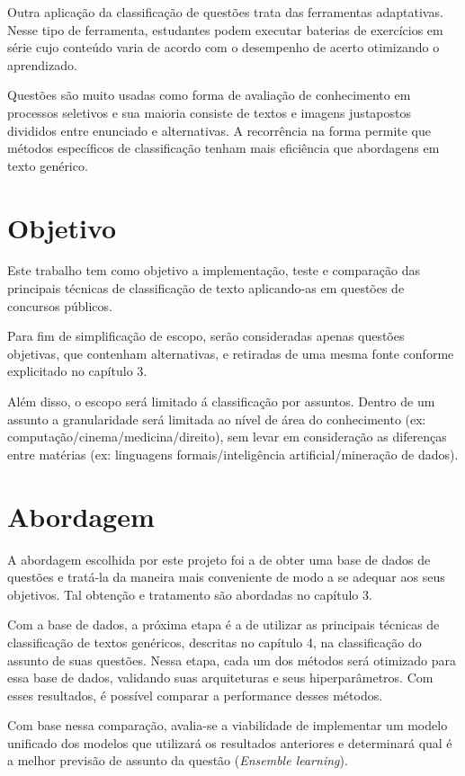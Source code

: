 Outra aplicação da classificação de questões trata das ferramentas adaptativas. Nesse tipo de ferramenta, estudantes podem executar baterias de exercícios em série cujo conteúdo varia de acordo com o desempenho de acerto otimizando o aprendizado.

Questões são muito usadas como forma de avaliação de conhecimento em processos seletivos e sua maioria consiste de textos e imagens justapostos divididos entre enunciado e alternativas. A recorrência na forma permite que métodos específicos de classificação tenham mais eficiência que abordagens em texto genérico.

\section{Objetivo}
Este trabalho tem como objetivo a implementação, teste e comparação das principais técnicas de classificação de texto aplicando-as em questões de concursos públicos.

Para fim de simplificação de escopo, serão consideradas apenas questões objetivas, que contenham alternativas, e retiradas de uma mesma fonte conforme explicitado no capítulo 3.

Além disso, o escopo será limitado á classificação por assuntos. Dentro de um assunto a granularidade será limitada ao nível de área do conhecimento (ex: computação/cinema/medicina/direito), sem levar em consideração as diferenças entre matérias (ex: linguagens formais/inteligência artificial/mineração de dados).

\section{Abordagem}
A abordagem escolhida por este projeto foi a de obter uma base de dados de questões e tratá-la da maneira mais conveniente de modo a se adequar aos seus objetivos. Tal obtenção e tratamento são abordadas no capítulo 3.

Com a base de dados, a próxima etapa é a de utilizar as principais técnicas de classificação de textos genéricos, descritas no capítulo 4, na classificação do assunto de suas questões. Nessa etapa, cada um dos métodos será otimizado para essa base de dados, validando suas arquiteturas e seus hiperparâmetros. Com esses resultados, é possível comparar a performance desses métodos.

Com base nessa comparação, avalia-se a viabilidade de implementar um modelo unificado dos modelos que utilizará os resultados anteriores e determinará qual é a melhor previsão de assunto da questão (\textit{Ensemble learning}).

